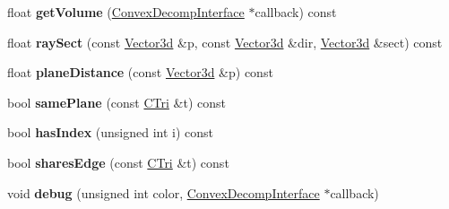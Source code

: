 \begin{DoxyCompactItemize}
\item 
\hypertarget{class_convex_decomposition_1_1_c_tri_af2efec0fb6f019358c0d330791e15a05}{float {\bfseries get\+Volume} (\hyperlink{class_convex_decomposition_1_1_convex_decomp_interface}{Convex\+Decomp\+Interface} $\ast$callback) const }\label{class_convex_decomposition_1_1_c_tri_af2efec0fb6f019358c0d330791e15a05}

\item 
\hypertarget{class_convex_decomposition_1_1_c_tri_a796132eb7e701d155aab3ec92cb10185}{float {\bfseries ray\+Sect} (const \hyperlink{class_convex_decomposition_1_1_vector3d}{Vector3d} \&p, const \hyperlink{class_convex_decomposition_1_1_vector3d}{Vector3d} \&dir, \hyperlink{class_convex_decomposition_1_1_vector3d}{Vector3d} \&sect) const }\label{class_convex_decomposition_1_1_c_tri_a796132eb7e701d155aab3ec92cb10185}

\item 
\hypertarget{class_convex_decomposition_1_1_c_tri_acdf2937e38c13f14c9a648fa80a811a3}{float {\bfseries plane\+Distance} (const \hyperlink{class_convex_decomposition_1_1_vector3d}{Vector3d} \&p) const }\label{class_convex_decomposition_1_1_c_tri_acdf2937e38c13f14c9a648fa80a811a3}

\item 
\hypertarget{class_convex_decomposition_1_1_c_tri_a2ea55bfe60e54a2591ba28bdd62c7c23}{bool {\bfseries same\+Plane} (const \hyperlink{class_convex_decomposition_1_1_c_tri}{C\+Tri} \&t) const }\label{class_convex_decomposition_1_1_c_tri_a2ea55bfe60e54a2591ba28bdd62c7c23}

\item 
\hypertarget{class_convex_decomposition_1_1_c_tri_acbfbd9c18dd98d1eacbf265562b1022d}{bool {\bfseries has\+Index} (unsigned int i) const }\label{class_convex_decomposition_1_1_c_tri_acbfbd9c18dd98d1eacbf265562b1022d}

\item 
\hypertarget{class_convex_decomposition_1_1_c_tri_a820a84cd7db29c0bf73da36bbd155263}{bool {\bfseries shares\+Edge} (const \hyperlink{class_convex_decomposition_1_1_c_tri}{C\+Tri} \&t) const }\label{class_convex_decomposition_1_1_c_tri_a820a84cd7db29c0bf73da36bbd155263}

\item 
\hypertarget{class_convex_decomposition_1_1_c_tri_afefd7ceaf039548a438a20ba82872b08}{void {\bfseries debug} (unsigned int color, \hyperlink{class_convex_decomposition_1_1_convex_decomp_interface}{Convex\+Decomp\+Interface} $\ast$callback)}\label{class_convex_decomposition_1_1_c_tri_afefd7ceaf039548a438a20ba82872b08}


\end{DoxyCompactItemize}
